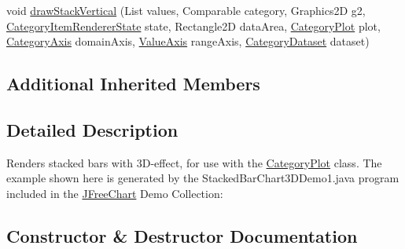 \begin{DoxyCompactItemize}
\item 
void \mbox{\hyperlink{classorg_1_1jfree_1_1chart_1_1renderer_1_1category_1_1_stacked_bar_renderer3_d_a54c025941324f1d0035b2d6984a0af61}{draw\+Stack\+Vertical}} (List values, Comparable category, Graphics2D g2, \mbox{\hyperlink{classorg_1_1jfree_1_1chart_1_1renderer_1_1category_1_1_category_item_renderer_state}{Category\+Item\+Renderer\+State}} state, Rectangle2D data\+Area, \mbox{\hyperlink{classorg_1_1jfree_1_1chart_1_1plot_1_1_category_plot}{Category\+Plot}} plot, \mbox{\hyperlink{classorg_1_1jfree_1_1chart_1_1axis_1_1_category_axis}{Category\+Axis}} domain\+Axis, \mbox{\hyperlink{classorg_1_1jfree_1_1chart_1_1axis_1_1_value_axis}{Value\+Axis}} range\+Axis, \mbox{\hyperlink{interfaceorg_1_1jfree_1_1data_1_1category_1_1_category_dataset}{Category\+Dataset}} dataset)
\end{DoxyCompactItemize}
\subsection*{Additional Inherited Members}


\subsection{Detailed Description}
Renders stacked bars with 3\+D-\/effect, for use with the \mbox{\hyperlink{}{Category\+Plot}} class. The example shown here is generated by the {\ttfamily Stacked\+Bar\+Chart3\+D\+Demo1.\+java} program included in the \mbox{\hyperlink{classorg_1_1jfree_1_1chart_1_1_j_free_chart}{J\+Free\+Chart}} Demo Collection\+: ~\newline
~\newline
  

\subsection{Constructor \& Destructor Documentation}
\mbox{\label{classorg_1_1jfree_1_1chart_1_1renderer_1_1category_1_1_stacked_bar_renderer3_d_a421bdc9cd4f4438c83e7fdca4e159e2e}} 
